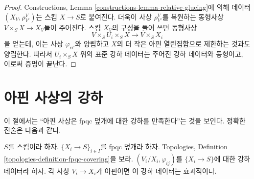 \begin{proof}
\medskip\noindent
Constructions, Lemma \ref{constructions-lemma-relative-glueing}에 의해
데이터 $(X_V, \rho^V_{V'})$는 스킴 $X \to S$로 붙여진다. 더욱이 사상
$\rho^V_{V'}$를 복원하는 동형사상 $V \times_S X \to X_V$들이 주어진다.
스킴 $X_V$의 구성을 풀어 쓰면 동형사상
$$
V \times_S U_i \times_S X
\longrightarrow
V \times_S X_i
$$
을 얻는데, 이는 사상 $\varphi_{ii'}$와 양립하고 $X$의 더 작은 아핀
열린집합으로 제한하는 것과도 양립한다. 따라서 $U_i \times_S X$ 위의
표준 강하 데이터는 주어진 강하 데이터와 동형이고, 이로써 증명이 끝난다.
\end{proof}










\section{아핀 사상의 강하}
\label{section-affine}

\noindent
이 절에서는 “아핀 사상은 fpqc 덮개에 대한 강하를 만족한다”는 것을
보인다. 정확한 진술은 다음과 같다.

\begin{lemma}
\label{lemma-affine}
$S$를 스킴이라 하자. $\{X_i \to S\}_{i\in I}$를 fpqc 덮개라 하자.
Topologies, Definition \ref{topologies-definition-fpqc-covering}을 보라.
$(V_i/X_i, \varphi_{ij})$를 $\{X_i \to S\}$에 대한 강하 데이터라 하자.
각 사상 $V_i \to X_i$가 아핀이면 이 강하 데이터는 효과적이다.
\end{lemma}

